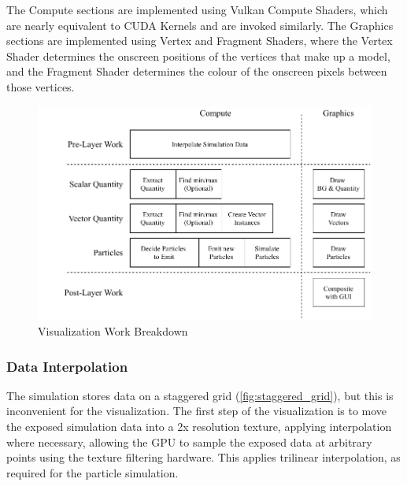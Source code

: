 The Compute sections are implemented using Vulkan Compute Shaders\cite{TheKhronosGroupVulkanSpec}, which are nearly equivalent to CUDA Kernels and are invoked similarly.
The Graphics sections are implemented using Vertex and Fragment Shaders, where the Vertex Shader determines the onscreen positions of the vertices that make up a model, and the Fragment Shader determines the colour of the onscreen pixels between those vertices.

\begin{figure}[h]
    \centering
    \includegraphics[width=\linewidth]{Ch42Design/figures/FinalReport_VizWork.pdf}
    \caption{Visualization Work Breakdown}
    \label{fig:VizBreakdown}
\end{figure}

\subsubsection{Data Interpolation}
The simulation stores data on a staggered grid (\cref{fig:staggered_grid}), but this is inconvenient for the visualization.
The first step of the visualization is to move the exposed simulation data into a 2x resolution texture, applying interpolation where necessary, allowing the GPU to sample the exposed data at arbitrary points using the texture filtering hardware.
This applies trilinear interpolation, as required for the particle simulation.

